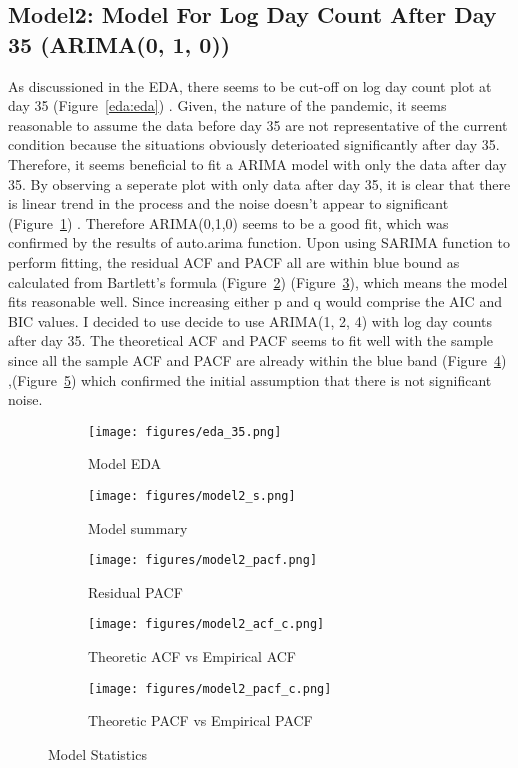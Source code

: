 \documentclass[a4paper]{article}
\begin{document}
\subsection{Model2: Model For Log Day Count After Day 35 (ARIMA(0, 1, 0))}
As discussioned in the EDA, there seems to be cut-off on log day count plot at
day 35 (Figure~\ref{eda:eda}) . Given, the nature of the pandemic, it seems
reasonable to assume the data before day 35 are not representative of the current
condition because the situations obviously deterioated significantly after day 35.
Therefore, it seems  beneficial to fit a ARIMA model with only the data after
day 35. By observing a seperate plot with only data after day 35, it is clear
that there is linear trend in the process and the noise doesn't appear to
significant (Figure~\ref{model2:eda}) . Therefore ARIMA(0,1,0) seems to be a good
fit, which was confirmed by the results of auto.arima function. Upon using SARIMA
function to perform fitting, the residual ACF and PACF all are within blue bound
as calculated from
Bartlett's formula (Figure~\ref{model2:s}) (Figure~\ref{model2:p}),
which means the model fits reasonable well. Since increasing either p and q would
comprise the AIC and BIC values. I decided to use  decide to use ARIMA(1, 2, 4)
with log day counts after day 35. The theoretical ACF and PACF seems to fit well
with the sample since all the sample ACF and PACF are already within the blue
band (Figure~\ref{model2:ac}) ,(Figure~\ref{model2:pc})  which confirmed the
initial assumption that there is not significant noise.



\begin{figure}[htpb]
\centering

\begin{subfigure}{.5\textwidth}
  \centering
  \texttt{[image: figures/eda\_35.png]}
  \caption{Model EDA}
  \label{model2:eda}
\end{subfigure}

\begin{subfigure}{.5\textwidth}
  \centering
  \texttt{[image: figures/model2\_s.png]}
  \caption{Model summary}
  \label{model2:s}
\end{subfigure}%
\begin{subfigure}{.5\textwidth}
  \centering
  \texttt{[image: figures/model2\_pacf.png]}
  \caption{Residual PACF}
  \label{model2:p}
\end{subfigure}

\begin{subfigure}{.5\textwidth}
	\centering
	\texttt{[image: figures/model2\_acf\_c.png]}
	\caption{Theoretic ACF vs Empirical ACF}
	\label{model2:ac}
\end{subfigure}%
\begin{subfigure}{.5\textwidth}
	\centering
	\texttt{[image: figures/model2\_pacf\_c.png]}
	\caption{Theoretic PACF vs Empirical PACF}
	\label{model2:pc}
\end{subfigure}

\caption{Model Statistics}
\label{model2}
\end{figure}
\end{document}
